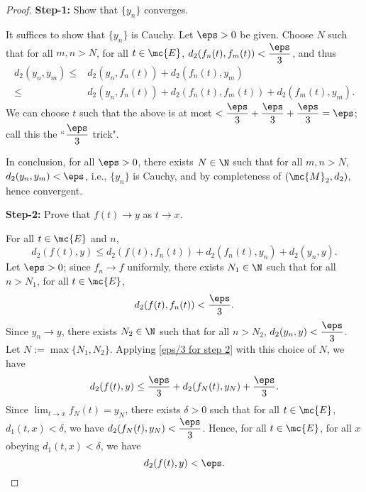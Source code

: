 \begin{proof}
	\textbf{Step-1:} Show that \(\{y_n\}\) converges.
	
	\medskip
	
	It suffices to show that \(\{y_n\}\) is Cauchy. Let \(\eps>0\) be given. Choose \(N\) such that for all \(m,n>N\), for all \(t\in \mc{E}\), \(d_2(f_n(t),f_m(t))<\displaystyle\frac{\eps}{3}\), and thus
	\begin{align*}
		d_2(y_n,y_m)\leq&d_2(y_n,f_n(t))+d_2(f_n(t),y_m)\\
					\leq&d_2(y_n,f_n(t))+d_2(f_n(t),f_m(t))+d_2(f_m(t),y_m).
	\end{align*}
	We can choose \(t\) such that the above is at most \(<\displaystyle\frac{\eps}{3}+\frac{\eps}{3}+\frac{\eps}{3}=\eps\); call this the ``\(\displaystyle\frac{\eps}{3}\) trick".
	
	\medskip
	
	In conclusion, for all \(\eps>0\), there exists \(N\in\N\) such that for all \(m,n>N\), \(d_2(y_n,y_m)<\eps\), i.e., \(\{y_n\}\) is Cauchy, and by completeness of \((\mc{M}_2, d_2)\), hence convergent.
	
	\bigskip
	
	\textbf{Step-2:} Prove that \(f(t)\to y\) as \(t\to x\).
	
	\medskip
	
	For all \(t\in\mc{E}\) and \(n\),
	\begin{equation}
		d_2(f(t),y)\leq d_2(f(t),f_n(t))+d_2(f_n(t),y_n)+d_2(y_n,y). \tag{\(\star\)} \label{eps/3 for step 2}
	\end{equation}
	Let \(\eps>0\); since \(f_n\to f\) uniformly, there exists \(N_1\in\N\) such that for all \(n>N_1\), for all \(t\in\mc{E}\),
	\begin{equation*}
		d_2(f(t), f_n(t))<\frac{\eps}{3}.
	\end{equation*}
	Since \(y_n\to y\), there exists \(N_2\in\N\) such that for all \(n>N_2\), \(d_2(y_n,y)<\displaystyle\frac{\eps}{3}\). Let \(N:=\operatorname{max}\{N_1,N_2\}\). Applying \cref{eps/3 for step 2} with this choice of \(N\), we have 
	\begin{equation*}
		d_2(f(t),y)\leq \frac{\eps}{3}+d_2(f_N(t),y_N)+\frac{\eps}{3}.
	\end{equation*}
	Since \(\displaystyle\lim_{t\to x}f_N(t)=y_N\), there exists \(\delta>0\) such that for all \(t\in\mc{E}\), \(d_1(t,x)<\delta\), we have \(d_2(f_N(t),y_N)<\displaystyle\frac{\eps}{3}\). Hence, for all \(t\in\mc{E}\), for all \(x\) obeying \(d_1(t,x)<\delta\), we have 
	\begin{equation*}
		d_2(f(t),y)<\eps.
	\end{equation*}
\end{proof}

